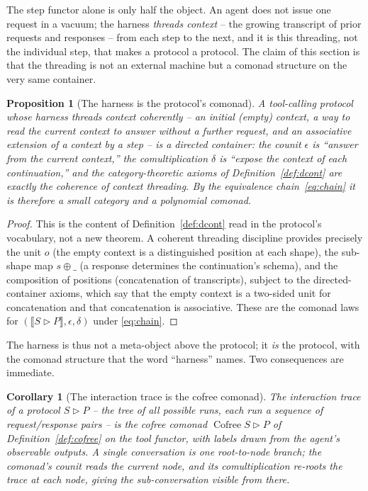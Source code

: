 \documentclass[11pt]{amsart}
\newcommand{\ctr}{\mathbin{\triangleright}}      %
\newcommand{\ext}[1]{\llbracket #1 \rrbracket}    %
\DeclareMathOperator{\cofree}{Cofree}
\theoremstyle{plain}
\newtheorem{proposition}{Proposition}
\newtheorem{corollary}{Corollary}
\theoremstyle{definition}
\theoremstyle{remark}
\begin{document}
The step functor alone is only half the object. An agent does not issue one request in a vacuum; the
harness \emph{threads context} -- the growing transcript of prior requests and responses -- from each
step to the next, and it is this threading, not the individual step, that makes a protocol a
protocol. The claim of this section is that the threading is not an external machine but a comonad
structure on the very same container.

\begin{proposition}[The harness is the protocol's comonad]\label{prop:harness}
A tool-calling protocol whose harness threads context coherently -- an initial (empty) context, a
way to read the current context to answer without a further request, and an associative extension of
a context by a step -- is a directed container: the counit $\epsilon$ is ``answer from the current
context,'' the comultiplication $\delta$ is ``expose the context of each continuation,'' and the
category-theoretic axioms of Definition~\ref{def:dcont} are exactly the coherence of context
threading. By the equivalence chain~\eqref{eq:chain} it is therefore a small category and a
polynomial comonad.
\end{proposition}

\begin{proof}
This is the content of Definition~\ref{def:dcont} read in the protocol's vocabulary, not a new
theorem. A coherent threading discipline provides precisely the unit $o$ (the empty context is a
distinguished position at each shape), the sub-shape map $s\oplus\_$ (a response determines the
continuation's schema), and the composition of positions (concatenation of transcripts), subject to
the directed-container axioms, which say that the empty context is a two-sided unit for concatenation
and that concatenation is associative. These are the comonad laws for $(\ext{S\ctr P},\epsilon,\delta)$
under \eqref{eq:chain}.
\end{proof}

\noindent The harness is thus not a meta-object above the protocol; it \emph{is} the protocol, with
the comonad structure that the word ``harness'' names. Two consequences are immediate.

\begin{corollary}[The interaction trace is the cofree comonad]\label{cor:trace}
The interaction trace of a protocol $S\ctr P$ -- the tree of all possible runs, each run a sequence
of request/response pairs -- is the cofree comonad $\cofree{S\ctr P}$ of Definition~\ref{def:cofree}
on the tool functor, with labels drawn from the agent's observable outputs. A single conversation is
one root-to-node branch; the comonad's counit reads the current node, and its comultiplication
re-roots the trace at each node, giving the sub-conversation visible from there.
\end{corollary}
\end{document}
